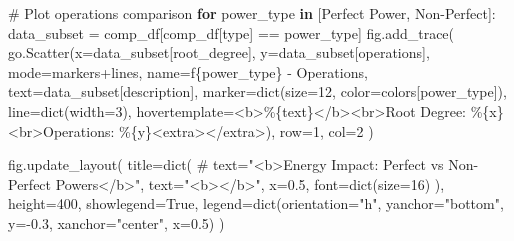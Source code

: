 \documentclass[
  letterpaper,
  DIV=11,
  numbers=noendperiod]{scrartcl}
\newenvironment{Shaded}{\begin{snugshade}}{\end{snugshade}}
\newcommand{\BuiltInTok}[1]{\textcolor[rgb]{0.00,0.23,0.31}{#1}}
\newcommand{\CommentTok}[1]{\textcolor[rgb]{0.37,0.37,0.37}{#1}}
\newcommand{\ControlFlowTok}[1]{\textcolor[rgb]{0.00,0.23,0.31}{\textbf{#1}}}
\newcommand{\DecValTok}[1]{\textcolor[rgb]{0.68,0.00,0.00}{#1}}
\newcommand{\FloatTok}[1]{\textcolor[rgb]{0.68,0.00,0.00}{#1}}
\newcommand{\KeywordTok}[1]{\textcolor[rgb]{0.00,0.23,0.31}{\textbf{#1}}}
\newcommand{\NormalTok}[1]{\textcolor[rgb]{0.00,0.23,0.31}{#1}}
\newcommand{\OperatorTok}[1]{\textcolor[rgb]{0.37,0.37,0.37}{#1}}
\newcommand{\SpecialCharTok}[1]{\textcolor[rgb]{0.37,0.37,0.37}{#1}}
\newcommand{\SpecialStringTok}[1]{\textcolor[rgb]{0.13,0.47,0.30}{#1}}
\newcommand{\StringTok}[1]{\textcolor[rgb]{0.13,0.47,0.30}{#1}}
\newcommand{\VariableTok}[1]{\textcolor[rgb]{0.07,0.07,0.07}{#1}}
\begin{document}
\begin{Shaded}
\begin{Highlighting}[]
\CommentTok{\# Plot operations comparison  }
\ControlFlowTok{for}\NormalTok{ power\_type }\KeywordTok{in}\NormalTok{ [}\StringTok{\textquotesingle{}Perfect Power\textquotesingle{}}\NormalTok{, }\StringTok{\textquotesingle{}Non{-}Perfect\textquotesingle{}}\NormalTok{]:}
\NormalTok{    data\_subset }\OperatorTok{=}\NormalTok{ comp\_df[comp\_df[}\StringTok{\textquotesingle{}type\textquotesingle{}}\NormalTok{] }\OperatorTok{==}\NormalTok{ power\_type]}
\NormalTok{    fig.add\_trace(}
\NormalTok{        go.Scatter(x}\OperatorTok{=}\NormalTok{data\_subset[}\StringTok{\textquotesingle{}root\_degree\textquotesingle{}}\NormalTok{], y}\OperatorTok{=}\NormalTok{data\_subset[}\StringTok{\textquotesingle{}operations\textquotesingle{}}\NormalTok{],}
\NormalTok{                   mode}\OperatorTok{=}\StringTok{\textquotesingle{}markers+lines\textquotesingle{}}\NormalTok{,}
\NormalTok{                   name}\OperatorTok{=}\SpecialStringTok{f\textquotesingle{}}\SpecialCharTok{\{}\NormalTok{power\_type}\SpecialCharTok{\}}\SpecialStringTok{ {-} Operations\textquotesingle{}}\NormalTok{,}
\NormalTok{                   text}\OperatorTok{=}\NormalTok{data\_subset[}\StringTok{\textquotesingle{}description\textquotesingle{}}\NormalTok{],}
\NormalTok{                   marker}\OperatorTok{=}\BuiltInTok{dict}\NormalTok{(size}\OperatorTok{=}\DecValTok{12}\NormalTok{, color}\OperatorTok{=}\NormalTok{colors[power\_type]),}
\NormalTok{                   line}\OperatorTok{=}\BuiltInTok{dict}\NormalTok{(width}\OperatorTok{=}\DecValTok{3}\NormalTok{),}
\NormalTok{                   hovertemplate}\OperatorTok{=}\StringTok{\textquotesingle{}\textless{}b\textgreater{}\%}\SpecialCharTok{\{text\}}\StringTok{\textless{}/b\textgreater{}\textless{}br\textgreater{}Root Degree: \%}\SpecialCharTok{\{x\}}\StringTok{\textless{}br\textgreater{}Operations: \%}\SpecialCharTok{\{y\}}\StringTok{\textless{}extra\textgreater{}\textless{}/extra\textgreater{}\textquotesingle{}}\NormalTok{),}
\NormalTok{        row}\OperatorTok{=}\DecValTok{1}\NormalTok{, col}\OperatorTok{=}\DecValTok{2}
\NormalTok{    )}

\NormalTok{fig.update\_layout(}
\NormalTok{    title}\OperatorTok{=}\BuiltInTok{dict}\NormalTok{(}
        \CommentTok{\# text="\textless{}b\textgreater{}Energy Impact: Perfect vs Non{-}Perfect Powers\textless{}/b\textgreater{}",}
\NormalTok{        text}\OperatorTok{=}\StringTok{"\textless{}b\textgreater{}\textless{}/b\textgreater{}"}\NormalTok{,}
\NormalTok{        x}\OperatorTok{=}\FloatTok{0.5}\NormalTok{,}
\NormalTok{        font}\OperatorTok{=}\BuiltInTok{dict}\NormalTok{(size}\OperatorTok{=}\DecValTok{16}\NormalTok{)}
\NormalTok{    ),}
\NormalTok{    height}\OperatorTok{=}\DecValTok{400}\NormalTok{,}
\NormalTok{    showlegend}\OperatorTok{=}\VariableTok{True}\NormalTok{,}
\NormalTok{    legend}\OperatorTok{=}\BuiltInTok{dict}\NormalTok{(orientation}\OperatorTok{=}\StringTok{"h"}\NormalTok{, yanchor}\OperatorTok{=}\StringTok{"bottom"}\NormalTok{, y}\OperatorTok{={-}}\FloatTok{0.3}\NormalTok{, xanchor}\OperatorTok{=}\StringTok{"center"}\NormalTok{, x}\OperatorTok{=}\FloatTok{0.5}\NormalTok{)}
\NormalTok{)}


\end{Highlighting}
\end{Shaded}
\end{document}
